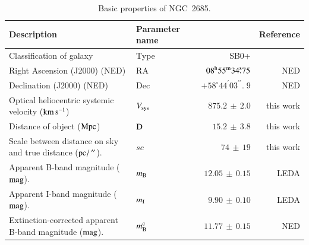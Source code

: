 \documentclass[oldversion]{aa}
\newcommand{\hmsm}[4]{{#1}^{\rm h}{#2}^{\rm m}{#3}^{\rm s}\!\!.\:\!{#4}}
\newcommand{\dmsm}[4]{\, {#1}^{\circ}{#2}^{\prime}{#3}^{\prime\prime}\!\!\!.\;\!{#4}}
\begin{document}
\begin{table}
\caption{
Basic properties of NGC~2685.}
\label{Tab_1}
\begin{center}
\begin{tabular}{llrr}
\hline
\hline
Description                                                                                & Parameter name                                &                             & Reference                          \\
\hline
Classification of galaxy                                                                   & Type                                          &    SB0+                      &  \citealt{Vaucouleurs91}        \\
Right Ascension (J2000) (NED)                                                              & RA                                            & $ \hmsm{08}{55}{34}{75}      $ &  NED                            \\
Declination (J2000) (NED)                                                                  & Dec                                           & $ \dmsm{+58}{44}{03}{9}      $ &  NED                            \\
Optical heliocentric systemic velocity ($\rm km\,{\rm s}^{-1}$)                            & $V_{\rm sys}$                                 & $     875.2   \,\pm\,  2.0   $ &  this work                      \\
Distance of object ($\rm Mpc$)                                                             & $\rm D$                                       & $      15.2   \,\pm\,  3.8   $ & this work \\
Scale between distance on sky and true distance (${\rm pc}/\,^{\prime\prime}$).            & $sc$                                          & $      74     \,\pm\, 19     $ & this work                       \\
Apparent B-band magnitude ($\rm mag$).                                                     & $m_{\rm B}$                                   & $      12.05  \,\pm\,  0.15  $ & LEDA \citep[][]{LEDA}           \\
Apparent I-band magnitude ($\rm mag$).                                                     & $m_{\rm I}$                                   & $       9.90  \,\pm\,  0.10  $ & LEDA \citep[][]{LEDA}           \\
Extinction-corrected apparent B-band magnitude ($\rm mag$).                                & $m_{\rm B}^{\rm c}$                           & $      11.77  \,\pm\,  0.15  $ & NED                             \\

\end{tabular}
\end{center}
\end{table}
\end{document}
